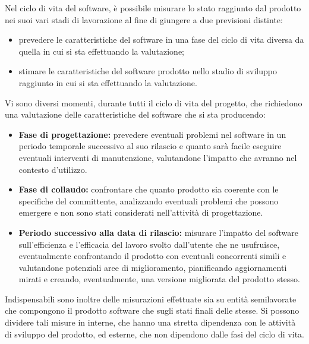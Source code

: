 Nel ciclo di vita del software, è possibile misurare lo stato raggiunto dal prodotto nei suoi vari stadi di lavorazione al fine di giungere a due previsioni distinte:
\begin{itemize}
 \item prevedere le caratteristiche del software in una fase del ciclo di vita diversa da quella in cui si sta effettuando la valutazione;
\item stimare le caratteristiche del software prodotto nello stadio di sviluppo raggiunto in cui si sta effettuando la valutazione.
\end{itemize}

Vi sono diversi momenti, durante tutti il ciclo di vita del progetto, che richiedono una valutazione delle caratteristiche del software che si sta producendo:
\begin{itemize}
\item \textbf{Fase di progettazione:} prevedere eventuali problemi nel software in un periodo temporale successivo al suo rilascio e quanto sarà facile eseguire eventuali interventi di manutenzione, valutandone l'impatto che avranno nel contesto d'utilizzo.

\item \textbf{Fase di collaudo:} confrontare che quanto prodotto sia coerente con le specifiche del committente, analizzando eventuali problemi che possono emergere e non sono stati considerati nell'attività di progettazione.

\item \textbf{Periodo successivo alla data di rilascio:} misurare l'impatto del software sull'efficienza e l'efficacia del lavoro svolto dall'utente che ne usufruisce, eventualmente confrontando il prodotto con eventuali concorrenti simili e valutandone potenziali aree di miglioramento, pianificando aggiornamenti mirati e creando, eventualmente, una versione migliorata del prodotto stesso.
\end{itemize}

Indispensabili sono inoltre delle misurazioni effettuate sia su entità semilavorate che compongono il prodotto software che sugli stati finali delle stesse. Si possono dividere tali misure in interne, che hanno una stretta dipendenza con le attività di sviluppo del prodotto, ed esterne, che non dipendono dalle fasi del ciclo di vita.


